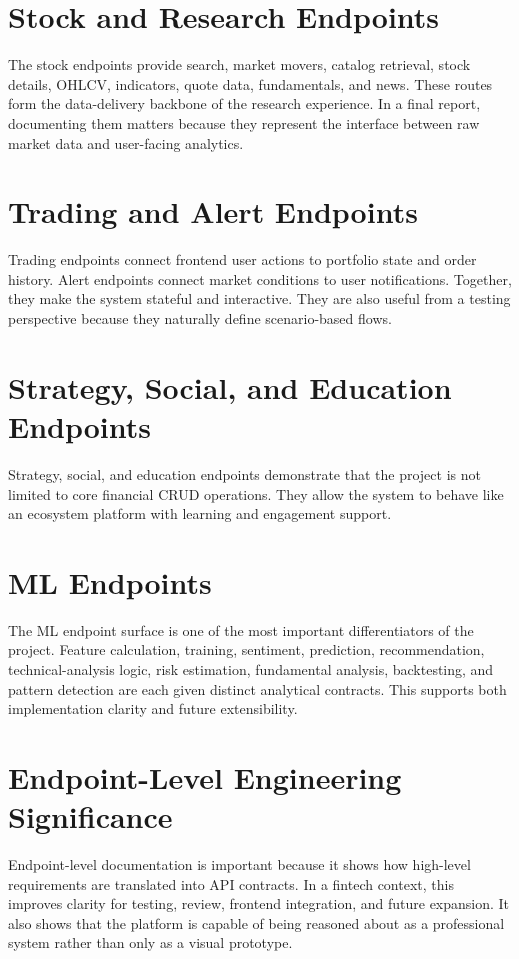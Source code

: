 \documentclass[12pt,a4paper]{report}
\begin{document}
\section{Stock and Research Endpoints}
The stock endpoints provide search, market movers, catalog retrieval, stock details, OHLCV, indicators, quote data, fundamentals, and news. These routes form the data-delivery backbone of the research experience. In a final report, documenting them matters because they represent the interface between raw market data and user-facing analytics.

\section{Trading and Alert Endpoints}
Trading endpoints connect frontend user actions to portfolio state and order history. Alert endpoints connect market conditions to user notifications. Together, they make the system stateful and interactive. They are also useful from a testing perspective because they naturally define scenario-based flows.

\section{Strategy, Social, and Education Endpoints}
Strategy, social, and education endpoints demonstrate that the project is not limited to core financial CRUD operations. They allow the system to behave like an ecosystem platform with learning and engagement support.

\section{ML Endpoints}
The ML endpoint surface is one of the most important differentiators of the project. Feature calculation, training, sentiment, prediction, recommendation, technical-analysis logic, risk estimation, fundamental analysis, backtesting, and pattern detection are each given distinct analytical contracts. This supports both implementation clarity and future extensibility.

\section{Endpoint-Level Engineering Significance}
Endpoint-level documentation is important because it shows how high-level requirements are translated into API contracts. In a fintech context, this improves clarity for testing, review, frontend integration, and future expansion. It also shows that the platform is capable of being reasoned about as a professional system rather than only as a visual prototype.
\end{document}
